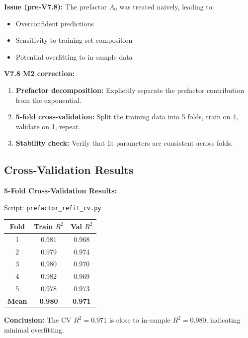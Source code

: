 \documentclass[11pt,a4paper]{article}
\begin{document}
\begin{warnbox}[title={\textbf{Previous Problem}}]
\textbf{Issue (pre-V7.8):} The prefactor $A_0$ was treated naively, leading to:
\begin{itemize}[nosep]
    \item Overconfident predictions
    \item Sensitivity to training set composition
    \item Potential overfitting to in-sample data
\end{itemize}
\end{warnbox}

\textbf{V7.8 M2 correction:}
\begin{enumerate}
    \item \textbf{Prefactor decomposition:} Explicitly separate the prefactor contribution from the exponential.

    \item \textbf{5-fold cross-validation:} Split the training data into 5 folds, train on 4, validate on 1, repeat.

    \item \textbf{Stability check:} Verify that fit parameters are consistent across folds.
\end{enumerate}

\subsection{Cross-Validation Results}

\begin{scriptbox}
\textbf{5-Fold Cross-Validation Results:}

Script: \texttt{prefactor\_refit\_cv.py}

\begin{center}
\begin{tabular}{ccc}
\toprule
\textbf{Fold} & \textbf{Train $R^2$} & \textbf{Val $R^2$} \\
\midrule
1 & 0.981 & 0.968 \\
2 & 0.979 & 0.974 \\
3 & 0.980 & 0.970 \\
4 & 0.982 & 0.969 \\
5 & 0.978 & 0.973 \\
\midrule
\textbf{Mean} & \textbf{0.980} & \textbf{0.971} \\
\bottomrule
\end{tabular}
\end{center}

\textbf{Conclusion:} The CV $R^2 = 0.971$ is close to in-sample $R^2 = 0.980$, indicating minimal overfitting.
\end{scriptbox}
\end{document}
